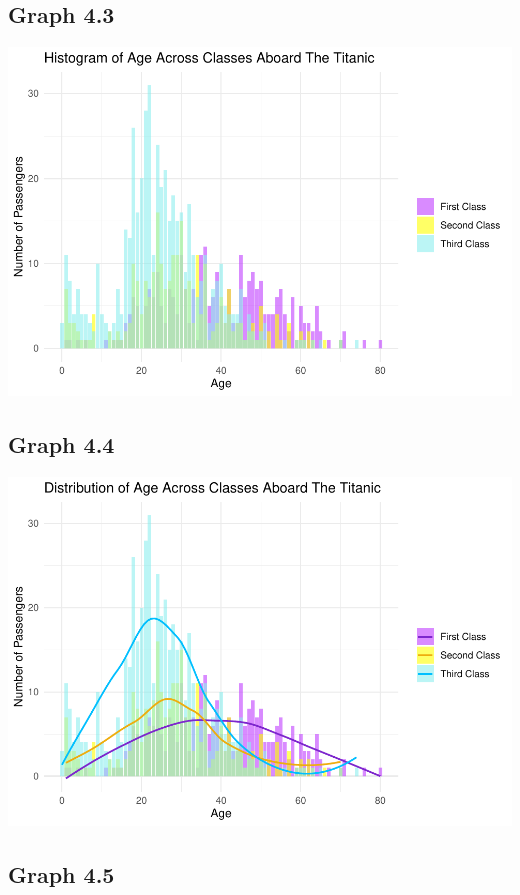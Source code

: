 \documentclass[
  11pt,
]{article}
\begin{document}
\hypertarget{graph-4.3}{%
\subsection{Graph 4.3}\label{graph-4.3}}

\includegraphics{README_files/figure-latex/unnamed-chunk-4-1.pdf}

\hypertarget{graph-4.4}{%
\subsection{Graph 4.4}\label{graph-4.4}}

\includegraphics{README_files/figure-latex/unnamed-chunk-5-1.pdf}

\hypertarget{graph-4.5}{%
\subsection{Graph 4.5}\label{graph-4.5}}
\end{document}
